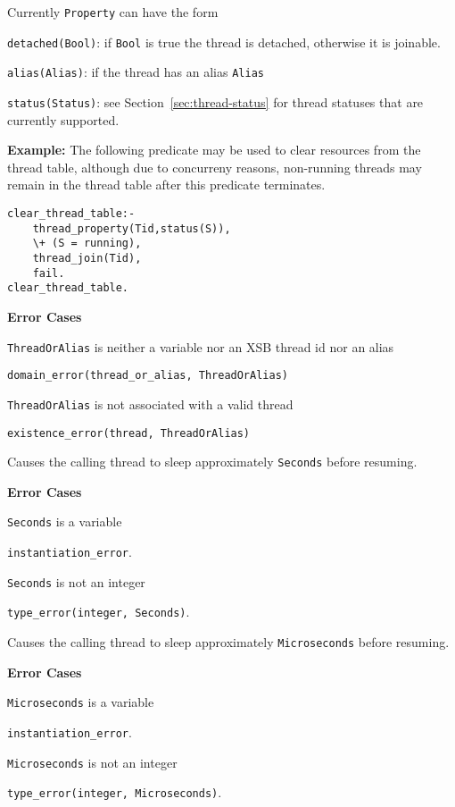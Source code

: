 \begin{description}
Currently {\tt Property} can have the form 
\bi
\item {\tt detached(Bool)}: if {\tt Bool} is true the thread is
  detached, otherwise it is joinable.
%
\item {\tt alias(Alias)}: if the thread has an alias {\tt Alias}
%
\item {\tt status(Status)}: see Section~\ref{sec:thread-status} for
  thread statuses that are currently supported.
\ei

{\bf Example:} The following predicate may be used to clear resources
from the thread table, although due to concurreny reasons, non-running
threads may remain in the thread table after this predicate
terminates.
\begin{verbatim}
clear_thread_table:- 
    thread_property(Tid,status(S)),
    \+ (S = running),
    thread_join(Tid),
    fail.
clear_thread_table.
\end{verbatim}

{\bf Error Cases}
%
\bi
\item {\tt ThreadOrAlias} is neither a variable nor an XSB thread id
  nor an alias
\bi
\item {\tt domain\_error(thread\_or\_alias, ThreadOrAlias)}
\ei
\item {\tt ThreadOrAlias} is not associated with a valid thread
\bi
\item {\tt existence\_error(thread, ThreadOrAlias)}
\ei
\ei

%
Causes the calling thread to sleep approximately {\tt Seconds}
before resuming.

{\bf Error Cases}
\bi
\item 	{\tt Seconds} is a variable
\bi
\item 	{\tt instantiation\_error}.
\ei
\item 	{\tt Seconds} is not an integer
\bi
\item 	{\tt type\_error(integer, Seconds)}.
\ei
\ei


%
Causes the calling thread to sleep approximately {\tt Microseconds}
before resuming.

{\bf Error Cases}
\bi
\item 	{\tt Microseconds} is a variable
\bi
\item 	{\tt instantiation\_error}.
\ei
\item 	{\tt Microseconds} is not an integer
\bi
\item 	{\tt type\_error(integer, Microseconds)}.
\ei
\ei
% 
\end{description}

